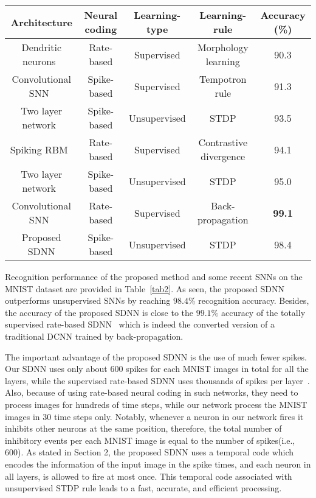 \documentclass[preprint,5p,12pt,twocolumn]{article}
\begin{document}
 
 \begin{table*}[!ht]
 \centering
\caption{Recognition accuracies of the proposed SDNN and some other SNNs over the MNIST dataset.}
\label{tab2}{\begin{tabular}{|c|c|c|c|c|}
\hline
Architecture &Neural coding& Learning-type & Learning-rule & Accuracy (\%)\\ \hline
Dendritic neurons~\cite{hussain2014improved} & Rate-based& Supervised & Morphology learning & 90.3\\
\hline
Convolutional SNN~\cite{zhao2015feedforward} & Spike-based & Supervised & Tempotron rule & 91.3\\
\hline
Two layer network~\cite{querlioz2013immunity} & Spike-based &Unsupervised &  STDP & 93.5\\
\hline
Spiking RBM~\cite{o2015real}& Rate-based & Supervised & Contrastive divergence & 94.1\\
\hline
Two layer network~\cite{diehl2015unsupervised} & Spike-based & Unsupervised &  STDP &
95.0\\
\hline
Convolutional SNN~\cite{diehl2015fast} & Rate-based & Supervised & Back-propagation & \textbf{99.1}\\
\hline
Proposed SDNN & Spike-based & Unsupervised & STDP & 98.4\\
\hline
\end{tabular}}
\end{table*}

  Recognition performance of the proposed method and some recent SNNs on the MNIST dataset are provided in Table~\ref{tab2}. As seen, the proposed SDNN outperforms unsupervised SNNs by reaching $98.4\%$ recognition accuracy. Besides, the accuracy of the proposed SDNN is close to the $99.1\%$ accuracy of the totally supervised rate-based SDNN~\cite{diehl2015fast} which is indeed the converted version of a traditional DCNN trained by back-propagation. 
 
The important advantage of the proposed SDNN is the use of much fewer spikes. Our SDNN  uses only about 600 spikes for each MNIST images in total for  all the layers, while the supervised rate-based SDNN uses thousands of spikes per layer~\cite{diehl2015fast}. Also, because of using rate-based neural coding in such networks, they need to process images for hundreds of time steps, while our network process the MNIST images in 30 time steps only. Notably, whenever a neuron in our network fires it inhibits other neurons at the same position, therefore, the total number of inhibitory events per each MNIST image is equal to the number of spikes(i.e., 600). As stated in Section 2, the proposed SDNN uses a temporal code which encodes the information of the input image in the spike times, and each neuron in all  layers, is allowed to fire at most once. This temporal code associated with unsupervised STDP rule leads to a fast, accurate, and efficient processing.
\end{document}
